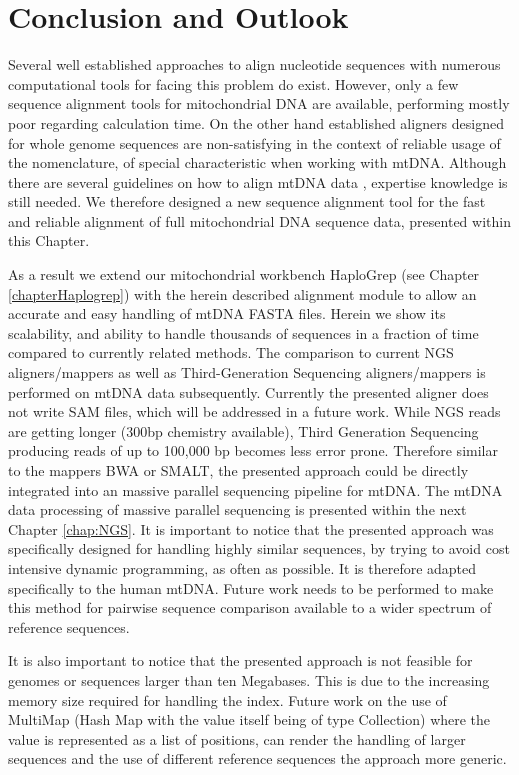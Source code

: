 \section{Conclusion and Outlook}
Several well established approaches to align nucleotide sequences with numerous computational tools for facing this problem do exist. However, only a few sequence alignment tools for mitochondrial DNA are available, performing mostly poor regarding calculation time. On the other hand established aligners designed for whole genome sequences are non-satisfying in the context of reliable usage of the nomenclature, of special characteristic when working with mtDNA. Although there are several guidelines on how to align mtDNA data \cite{Wilson2002,Bandelt2008,Polanskey2010}, expertise knowledge is still needed. We therefore designed a new sequence alignment tool for the fast and reliable alignment of full mitochondrial DNA sequence data, presented within this Chapter. 

As a result we extend our mitochondrial workbench HaploGrep (see Chapter \ref{chapterHaplogrep}) with the herein described alignment module to allow an accurate and easy handling of mtDNA FASTA files. Herein we show its scalability, and ability to handle thousands of sequences in a fraction of time compared to currently related methods. The comparison to current NGS aligners/mappers as well as Third-Generation Sequencing aligners/mappers is performed on mtDNA data subsequently. Currently the presented aligner does not write SAM files, which will be addressed in a future work. While NGS reads are getting longer (300bp chemistry available), Third Generation Sequencing producing reads of up to 100,000 bp becomes less error prone. Therefore similar to the mappers BWA or SMALT, the presented approach could be directly integrated into an massive parallel sequencing pipeline for mtDNA. 
The mtDNA data processing of massive parallel sequencing is presented within the next Chapter \ref{chap:NGS}. It is important to notice that the presented approach was specifically designed for handling highly similar sequences, by trying to avoid cost intensive dynamic programming, as often as possible. It is therefore adapted specifically to the human mtDNA. Future work needs to be performed to make this method for pairwise sequence comparison available to a wider spectrum of reference sequences. 

It is also important to notice that the presented approach is not feasible for genomes or sequences larger than ten Megabases. This is due to the increasing memory size required for handling the index. Future work on the use of MultiMap (Hash Map with the value itself being of type Collection) where the value is represented as a list of positions, can render the handling of larger sequences and the use of different reference sequences  the approach more generic. 




